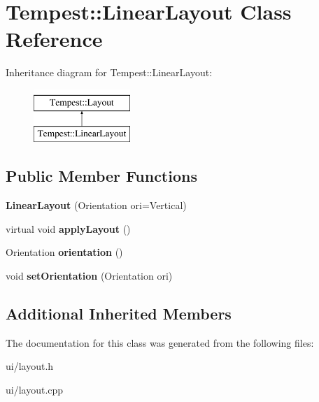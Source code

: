 \hypertarget{class_tempest_1_1_linear_layout}{\section{Tempest\+:\+:Linear\+Layout Class Reference}
\label{class_tempest_1_1_linear_layout}
}
Inheritance diagram for Tempest\+:\+:Linear\+Layout\+:\begin{figure}[H]
\begin{center}
\leavevmode
\includegraphics[height=2.000000cm]{class_tempest_1_1_linear_layout}
\end{center}
\end{figure}
\subsection*{Public Member Functions}
\begin{DoxyCompactItemize}
\item 
\hypertarget{class_tempest_1_1_linear_layout_a8c7f0a3f9894f50389e559985be3691a}{{\bfseries Linear\+Layout} (Orientation ori=Vertical)}\label{class_tempest_1_1_linear_layout_a8c7f0a3f9894f50389e559985be3691a}

\item 
\hypertarget{class_tempest_1_1_linear_layout_a4f61198d68d3b6c24280c860ef03ed72}{virtual void {\bfseries apply\+Layout} ()}\label{class_tempest_1_1_linear_layout_a4f61198d68d3b6c24280c860ef03ed72}

\item 
\hypertarget{class_tempest_1_1_linear_layout_a532b381abbc88f33aaa47958eb732524}{Orientation {\bfseries orientation} ()}\label{class_tempest_1_1_linear_layout_a532b381abbc88f33aaa47958eb732524}

\item 
\hypertarget{class_tempest_1_1_linear_layout_aac24f75e5b6e30dfe3df3a3b263d6d0a}{void {\bfseries set\+Orientation} (Orientation ori)}\label{class_tempest_1_1_linear_layout_aac24f75e5b6e30dfe3df3a3b263d6d0a}

\end{DoxyCompactItemize}
\subsection*{Additional Inherited Members}


The documentation for this class was generated from the following files\+:\begin{DoxyCompactItemize}
\item 
ui/layout.\+h\item 
ui/layout.\+cpp\end{DoxyCompactItemize}
